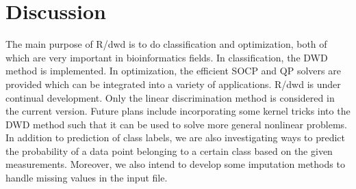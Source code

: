 \documentclass{bioinfo}
\begin{document}
\section{Discussion}
The main purpose of R/dwd is to do classification and optimization, both of
which are very important in bioinformatics fields. In classification, the DWD
method is implemented. In optimization, the efficient SOCP and QP solvers are provided
which can be integrated into a variety of applications. R/dwd is under continual
development. Only the linear discrimination method is considered in the
current version. Future plans include incorporating some kernel tricks into the
DWD method such that it can be used to solve more general nonlinear problems. In
addition to prediction of class labels, we are also investigating ways to predict the
probability of a data point belonging to a certain class based on the given
measurements. Moreover, we also intend to develop some imputation methods to
handle missing values in the input file.
\end{document}
